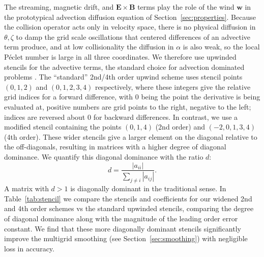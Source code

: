 \documentclass[11pt]{article}
\begin{document}
The streaming, magnetic drift, and $\mathbf{E}\times\mathbf{B}$ terms play the
role of the wind $\mathbf{w}$ in the prototypical advection diffusion equation of
Section~\ref{sec:properties}. Because the collision operator acts only in velocity
space, there is no physical diffusion in $\theta, \zeta$ to damp the grid scale
oscillations that centered differences of an advective term produce, and at low
collisionality the diffusion in $\alpha$ is also weak, so the local P\'eclet number
is large in all three coordinates. We therefore use upwinded stencils for the
advective terms, the standard choice for advection dominated problems
\cite{morton_numerical_1996, oosterlee_multigrid_1998}. The ``standard'' 2nd/4th
order upwind scheme uses stencil points $(0,1,2)$ and $(0,1,2,3,4)$ respectively,
where these integers give the relative grid indices for a forward difference, with
$0$ being the point the derivative is being evaluated at, positive numbers are grid
points to the right, negative to the left; indices are reversed about 0 for backward
differences.
In contrast, we use a modified stencil containing the points $(0,1,4)$ (2nd
order) and $(-2, 0, 1, 3, 4)$ (4th order). These wider stencils give a larger
element on the diagonal relative to the off-diagonals, resulting in matrices
with a higher degree of diagonal dominance. We quantify this diagonal dominance with
the ratio $d$:
\begin{equation}
d = \frac{|a_{ii}|}{\sum_{j \neq i} |a_{ij}|}.
\end{equation}
A matrix with $d>1$ is diagonally dominant in the traditional sense. In
Table~\ref{tab:stencil} we compare the stencils and coefficients for our
widened 2nd and 4th order schemes vs the standard upwinded stencils, comparing
the degree of diagonal dominance along with the magnitude of the leading order
error constant. We find that these more diagonally dominant stencils
significantly improve the multigrid smoothing (see Section~\ref{sec:smoothing})
with negligible loss in accuracy.
\end{document}
